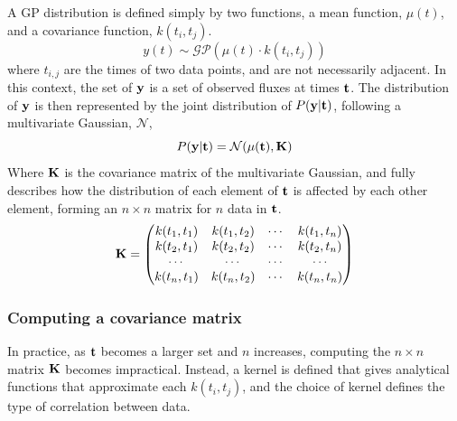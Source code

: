 A GP distribution is defined simply by two functions, a mean function, $\mu(t)$, and a covariance function, $k(t_i, t_j)$.
\begin{equation}
    y(t) \sim \mathcal{GP}(\mu(t) \cdot k(t_i, t_j))
\end{equation}
where $t_{i, j}$ are the times of two data points, and are not necessarily adjacent. In this context, the set of $\bf y$ is a set of observed fluxes at times $\bf t$. The distribution of $\bf y$ is then represented by the joint distribution of $P({\bf y} | {\bf t})$, following a multivariate Gaussian, $\mathcal{N}$,
\begin{equation}
    P({\bf y} | {\bf t}) = \mathcal{N}(\mu({\bf t}), {\bf K})
\end{equation}
Where $\bf K$ is the covariance matrix of the multivariate Gaussian, and fully describes how the distribution of each element of $\bf t$ is affected by each other element, forming an $n \times n$ matrix for $n$ data in $\bf t$.
\begin{equation}
    {\bf K} =   \begin{pmatrix}
        k(t_1, t_1) & k(t_1, t_2) & \cdots & k(t_1, t_n) \\
        k(t_2, t_1) & k(t_2, t_2) & \cdots & k(t_2, t_n) \\
        \cdots      & \cdots      & \cdots & \cdots      \\
        k(t_n, t_1) & k(t_n, t_2) & \cdots & k(t_n, t_n) \\
            \end{pmatrix}
\end{equation}

\subsubsection{Computing a covariance matrix}
\label{sect:modelling:GP Kernel choice}

In practice, as $\bf t$ becomes a larger set and $n$ increases, computing the $n \times n$ matrix $\bf K$ becomes impractical. Instead, a kernel is defined that gives analytical functions that approximate each $k(t_i, t_j)$, and the choice of kernel defines the type of correlation between data.

